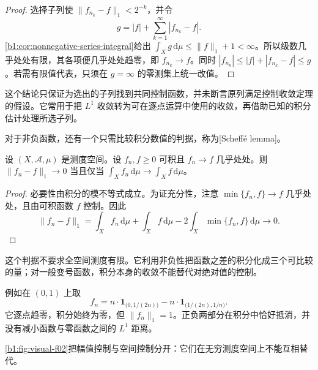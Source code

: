 \begin{proof}
选择子列使 \(\|f_{n_k}-f\|_1<2^{-k}\)，并令
\[
g=|f|+\sum_{k=1}^{\infty}|f_{n_k}-f|.
\]
\cref{b1:cor:nonnegative-series-integral}给出 \(\int_Xg\,\mathrm d\mu\leq\|f\|_1+1<\infty\)。所以级数几乎处处有限，其各项便几乎处处趋零，即 \(f_{n_k}\to f\)。同时 \(|f_{n_k}|\leq|f|+|f_{n_k}-f|\leq g\)。若需有限值代表，只须在 \(g=\infty\) 的零测集上统一改值。
\end{proof}

这个结论只保证为选出的子列找到共同控制函数，并未断言原列满足控制收敛定理的假设。它常用于把 \(L^1\) 收敛转为可在逐点运算中使用的收敛，再借助已知的积分估计处理所选子列。

\ProseParagraphBreak

对于非负函数，还有一个只需比较积分数值的判据，称为[Scheff\'e lemma]。

\begin{proposition}[Scheff\'e]
\label{b1:prop:scheffe-lemma}
设 \((X,\mathcal A,\mu)\) 是测度空间。设 \(f_n,f\geq0\) 可积且 \(f_n\to f\) 几乎处处。则 \(\|f_n-f\|_1\to0\) 当且仅当 \(\int_Xf_n\,\mathrm d\mu\to\int_Xf\,\mathrm d\mu\)。
\end{proposition}

\begin{proof}
必要性由积分的模不等式成立。为证充分性，注意 \(\min\{f_n,f\}\to f\) 几乎处处，且由可积函数 \(f\) 控制。因此
\[
\|f_n-f\|_1
=\int_Xf_n\,\mathrm d\mu+\int_Xf\,\mathrm d\mu
-2\int_X\min\{f_n,f\}\,\mathrm d\mu
\longrightarrow0.
\]
\end{proof}

这个判据不要求全空间测度有限。它利用非负性把函数之差的积分化成三个可比较的量；对一般变号函数，积分本身的收敛不能替代对绝对值的控制。

\ProseParagraphBreak

例如在 \((0,1)\) 上取
\[
f_n=n\cdot\mathbf 1_{\bigl(0,1/(2n)\bigr)}
-n\cdot\mathbf 1_{\bigl(1/(2n),1/n\bigr)}.
\]
它逐点趋零，积分始终为零，但 \(\|f_n\|_1=1\)。正负两部分在积分中恰好抵消，并没有减小函数与零函数之间的 \(L^1\) 距离。

\cref{b1:fig:visual-f02}把幅值控制与空间控制分开：它们在无穷测度空间上不能互相替代。

